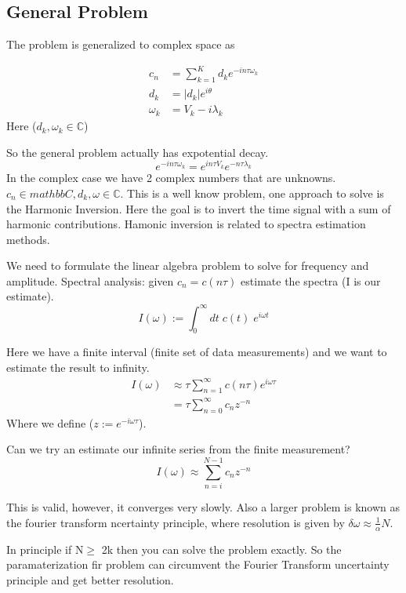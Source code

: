 \documentclass{article}
\newcommand{\be}{\begin{equation}}
\newcommand{\ee}{\end{equation}}
\begin{document}
\subsection{General Problem}
The problem is generalized to complex space as

\be
\begin{split}
    c_n &= \sum_{k=1}^K d_k e^{-in\tau \omega_k}\\
    d_k &= |d_k|e^{i\theta}\\
    \omega_k &= V_k - i\lambda_k
\end{split}
\ee
Here ($d_k,\omega_k \in \mathbb{C}$)

So the general problem actually has expotential decay.
\be
e^{-in\tau \omega_k} = e^{in\tau V_k}e^{-n\tau \lambda_k}
\ee
In the complex case we have 2 complex numbers that are unknowns.
$c_n \in mathbb{C}, d_k, \omega \in \mathbb{C}$.
This is a well know problem, one approach to solve is the Harmonic Inversion.
Here the goal is to invert the time signal with a sum of harmonic contributions.
Hamonic inversion is related to spectra estimation methods.

We need to formulate the linear algebra problem to solve for frequency and amplitude.
Spectral analysis: given $c_n = c(n\tau)$ estimate the spectra (I is our estimate).
\be
I(\omega) := \int_0^\infty dt\; c(t)\; e^{i\omega t}
\ee

Here we have a finite interval (finite set of data measurements) and we want to estimate the result to infinity.
\be
\begin{split}
    I(\omega) &\approx \tau \sum_{n=1}^\infty c(n\tau)e^{i\omega\tau}\\
    &= \tau \sum_{n=0}^\infty c_n z^{-n}
\end{split}
\ee
Where we define ($z:=e^{-i\omega\tau}$).

Can we try an estimate our infinite series from the finite measurement?
\be
I(\omega) \approx \sum_{n=i}^{N-1} c_n z^{-n}
\ee

This is valid, however, it converges very slowly.
Also a larger problem is known as the fourier transform ncertainty principle, where resolution is given by $\delta \omega \approx \frac{1}{\alpha} N$.

In principle if N$\geq$ 2k then you can solve the problem exactly.
So the paramaterization fir problem can circumvent the Fourier Transform uncertainty principle and get better resolution.
\end{document}

